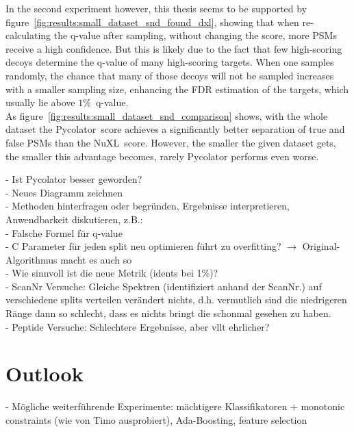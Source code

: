 In the second experiment however, this thesis seems to be supported by figure~\ref{fig:results:small_dataset_snd_found_dxl}, showing that when re-calculating the q-value after sampling, without changing the score, more PSMs receive a high confidence. But this is likely due to the fact that few high-scoring decoys determine the q-value of many high-scoring targets. When one samples randomly, the chance that many of those decoys will not be sampled increases with a smaller sampling size, enhancing the FDR estimation of the targets, which usually lie above $1\%$~q-value.\\
As figure~\ref{fig:results:small_dataset_snd_comparison} shows, with the whole dataset the Pycolator~score achieves a significantly better separation of true and false PSMs than the NuXL~score. However, the smaller the given dataset gets, the smaller this advantage becomes, rarely Pycolator performs even worse.

- Ist Pycolator besser geworden?\\
- Neues Diagramm zeichnen\\
- Methoden hinterfragen oder begründen, Ergebnisse interpretieren, Anwendbarkeit diskutieren, z.B.:\\
- Falsche Formel für q-value\\
- C Parameter für jeden split neu optimieren führt zu overfitting? $\rightarrow$ Original-Algorithmus macht es auch so\\
- Wie sinnvoll ist die neue Metrik (idents bei 1\%)?\\
- ScanNr Versuche: Gleiche Spektren (identifiziert anhand der ScanNr.) auf verschiedene splits verteilen verändert nichts, d.h. vermutlich sind die niedrigeren Ränge dann so schlecht, dass es nichts bringt die schonmal gesehen zu haben.\\
- Peptide Versuche: Schlechtere Ergebnisse, aber vllt ehrlicher?\\
\section{Outlook}
- Mögliche weiterführende Experimente: mächtigere Klassifikatoren + monotonic constraints (wie von Timo ausprobiert), Ada-Boosting, feature selection

